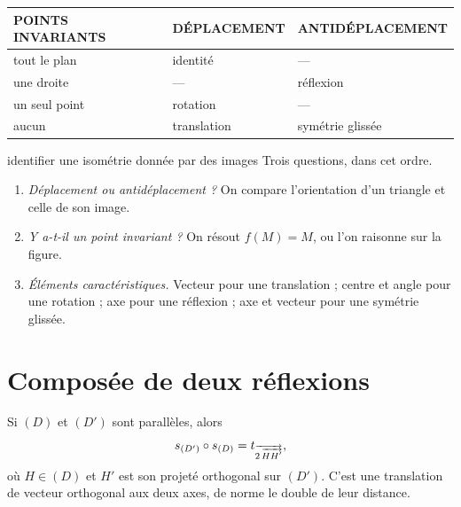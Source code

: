 \begin{propriete}
\begin{center}
\setlength{\tabcolsep}{9pt}
\renewcommand{\arraystretch}{1.25}
\begin{tabular}{@{}lll@{}}
\toprule
\textsf{\footnotesize\bfseries POINTS INVARIANTS} &
\textsf{\footnotesize\bfseries DÉPLACEMENT} &
\textsf{\footnotesize\bfseries ANTIDÉPLACEMENT} \\
\midrule
tout le plan & identité & — \\
une droite   & — & réflexion \\
un seul point & rotation & — \\
aucun & translation & symétrie glissée \\
\bottomrule
\end{tabular}
\end{center}
\end{propriete}

\begin{methode}{identifier une isométrie donnée par des images}
Trois questions, dans cet ordre.
\begin{enumerate}[label=\textbf{\arabic*.}, leftmargin=*, itemsep=0.15em]
  \item \emph{Déplacement ou antidéplacement ?} On compare l'orientation d'un
        triangle et celle de son image.
  \item \emph{Y a-t-il un point invariant ?} On résout $f(M) = M$, ou l'on
        raisonne sur la figure.
  \item \emph{Éléments caractéristiques.} Vecteur pour une translation ;
        centre et angle pour une rotation ; axe pour une réflexion ; axe et
        vecteur pour une symétrie glissée.
\end{enumerate}
\end{methode}

\section{Composée de deux réflexions}

\begin{theoreme}
Si $(D)$ et $(D')$ sont parallèles, alors
\[
  s_{(D')} \circ s_{(D)} = t_{\overrightarrow{2\,\overrightarrow{HH'}}},
\]
où $H \in (D)$ et $H'$ est son projeté orthogonal sur $(D')$. C'est une
translation de vecteur orthogonal aux deux axes, de norme le double de leur
distance.
\end{theoreme}

